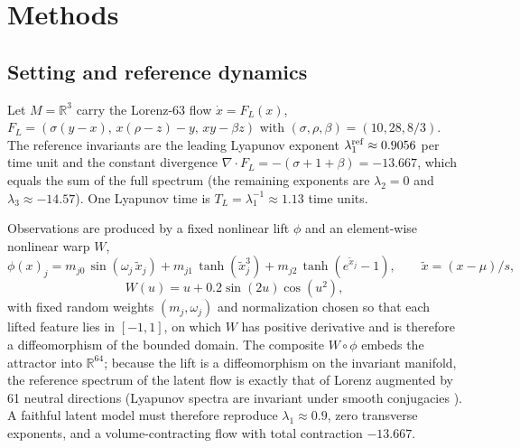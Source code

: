 \documentclass[11pt]{article}
\newcommand{\R}{\mathbb{R}}
\newcommand{\grad}{\nabla}
\begin{document}
\section{Methods}
\label{sec:methods}

\subsection{Setting and reference dynamics}
\label{sec:methods-setup}

Let $M=\R^3$ carry the Lorenz-63 flow
$\dot x=F_L(x)$, $F_L=(\sigma(y-x),\,x(\rho-z)-y,\,xy-\beta z)$ with
$(\sigma,\rho,\beta)=(10,28,8/3)$. The reference invariants are the
leading Lyapunov exponent $\lambda_1^{\rm ref}\approx0.9056$ per time
unit and the constant divergence $\grad\!\cdot F_L=-(\sigma+1+\beta)=
-13.667$, which equals the sum of the full spectrum (the remaining
exponents are $\lambda_2=0$ and $\lambda_3\approx-14.57$). One Lyapunov
time is $T_L=\lambda_1^{-1}\approx1.13$ time units.

Observations are produced by a fixed nonlinear lift $\phi$ and an
element-wise nonlinear warp $W$,
\begin{equation}
  \phi(x)_j = m_{j0}\, \sin(\omega_j\, \tilde x_j) +
              m_{j1}\, \tanh(\tilde x_j^3) +
              m_{j2}\, \tanh(e^{\tilde x_j}-1),
  \qquad \tilde x = (x-\mu)/s,
\end{equation}
\begin{equation}
  W(u)=u+0.2\sin(2u)\cos(u^2),
\end{equation}
with fixed random weights $(m_j,\omega_j)$ and normalization chosen so
that each lifted feature lies in $[-1,1]$, on which $W$ has positive
derivative and is therefore a diffeomorphism of the bounded domain. The
composite $W\circ\phi$ embeds the attractor into $\R^{64}$; because the
lift is a diffeomorphism on the invariant manifold, the reference
spectrum of the latent flow is exactly that of Lorenz augmented by 61
neutral directions (Lyapunov spectra are invariant under smooth
conjugacies \cite{oseledets1968multiplicative,barreira2002lyapunov}). A
faithful latent model must therefore reproduce $\lambda_1\approx0.9$,
zero transverse exponents, and a volume-contracting flow with total
contraction $-13.667$.
\end{document}
